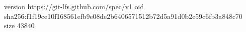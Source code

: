 version https://git-lfs.github.com/spec/v1
oid sha256:f1f19ce10f168561efb9e08de2b6406571512b72d5a91d0b2c59c6fb3a848c70
size 43840
